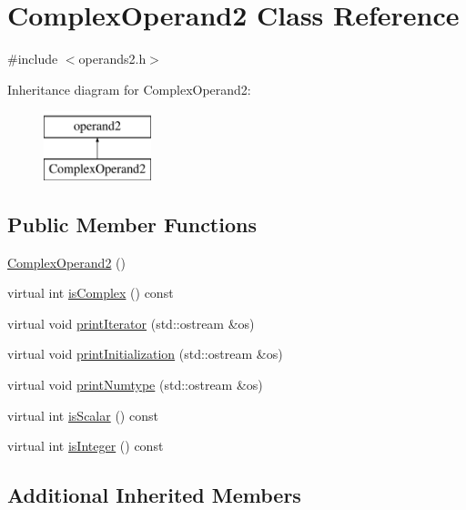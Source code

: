\hypertarget{classComplexOperand2}{}\section{Complex\+Operand2 Class Reference}
\label{classComplexOperand2}


{\ttfamily \#include $<$operands2.\+h$>$}

Inheritance diagram for Complex\+Operand2\+:\begin{figure}[H]
\begin{center}
\leavevmode
\includegraphics[height=2.000000cm]{classComplexOperand2}
\end{center}
\end{figure}
\subsection*{Public Member Functions}
\begin{DoxyCompactItemize}
\item 
\hyperlink{classComplexOperand2_ac2fce5aad513a732c657a7a7c8003bf6}{Complex\+Operand2} ()
\item 
virtual int \hyperlink{classComplexOperand2_a1bcf279efb3e4be8d292edc3fdaacf43}{is\+Complex} () const 
\item 
virtual void \hyperlink{classComplexOperand2_aaf91e20ba55460eab5dfdcfe041826c0}{print\+Iterator} (std\+::ostream \&os)
\item 
virtual void \hyperlink{classComplexOperand2_a46db03aec01b3e95a1fd8bf4ee442a8b}{print\+Initialization} (std\+::ostream \&os)
\item 
virtual void \hyperlink{classComplexOperand2_adde2c5b0628e15375f6b4b464a4f33e3}{print\+Numtype} (std\+::ostream \&os)
\item 
virtual int \hyperlink{classComplexOperand2_abc22a25798dbcaa9e6ef563b10721cb1}{is\+Scalar} () const 
\item 
virtual int \hyperlink{classComplexOperand2_a9b66e1e55f3af419f50f177038212623}{is\+Integer} () const 
\end{DoxyCompactItemize}
\subsection*{Additional Inherited Members}


